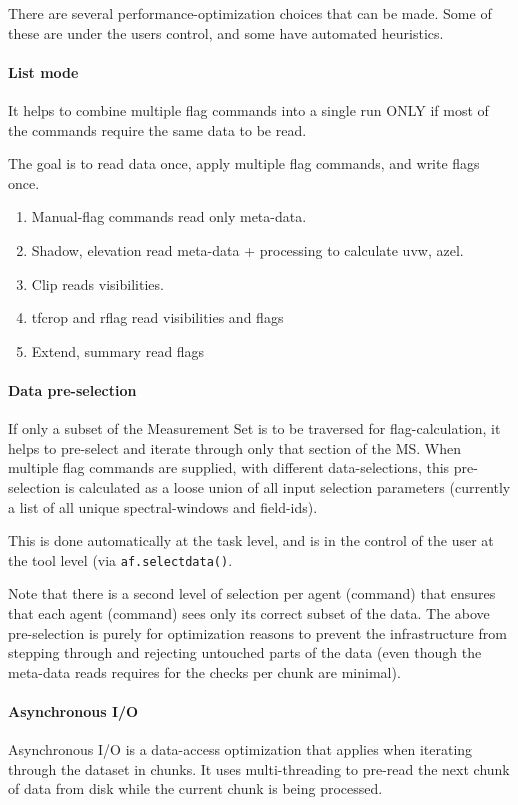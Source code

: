 There are several performance-optimization choices that can be made. 
Some of these are under the users control, and some have automated heuristics.

\paragraph{List mode}

It helps to combine multiple flag commands into a single run ONLY if most of the
commands require the same data to be read.  

The goal is to read data once, apply multiple flag commands, and write flags once.

\begin{enumerate}
\item  Manual-flag commands read only meta-data.
\item  Shadow, elevation read meta-data + processing to calculate uvw, azel.
\item  Clip reads visibilities.
\item  tfcrop and rflag read visibilities and flags
\item Extend, summary read flags
\end{enumerate}



\paragraph{Data pre-selection}
If only a subset of the Measurement Set is to be traversed for flag-calculation,
it helps to pre-select and iterate through only that section of the MS.  
When multiple flag commands are supplied, with different data-selections, 
this pre-selection is calculated as a loose union of all input selection parameters
(currently a list of all unique spectral-windows and field-ids).

This is done automatically at the task level, and is in the control of the user at the 
tool level (via {\tt af.selectdata()}.

Note that there is a second level of selection per agent (command) that ensures
that each agent (command) sees only its correct subset of the data. 
The above pre-selection is purely for optimization reasons to prevent the infrastructure
from stepping through and rejecting untouched parts of the data (even though the
meta-data reads requires for the checks per chunk are minimal). 

\paragraph{Asynchronous I/O}
Asynchronous I/O is a data-access optimization that applies when iterating through the
dataset in chunks.  It uses multi-threading to pre-read the next chunk of data from disk
while the current chunk is being processed.


